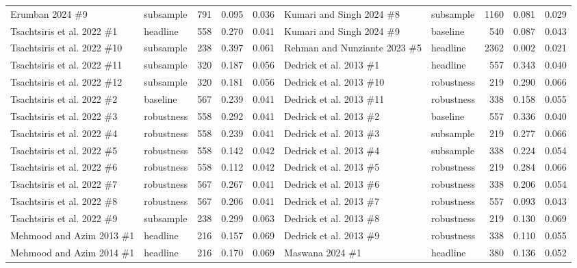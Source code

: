 {\begin{longtable}{@{}p{3.0cm} l r r r@{\hspace{0.8em}}p{3.0cm} l r r r@{}}
Erumban 2024 \#9 & subsample & 791 & 0.095 & 0.036 & Kumari and Singh 2024 \#8 & subsample & 1160 & 0.081 & 0.029 \\
Tsachtsiris et al. 2022 \#1 & headline & 558 & 0.270 & 0.041 & Kumari and Singh 2024 \#9 & baseline & 540 & 0.087 & 0.043 \\
Tsachtsiris et al. 2022 \#10 & subsample & 238 & 0.397 & 0.061 & Rehman and Nunziante 2023 \#5 & headline & 2362 & 0.002 & 0.021 \\
Tsachtsiris et al. 2022 \#11 & subsample & 320 & 0.187 & 0.056 & Dedrick et al. 2013 \#1 & headline & 557 & 0.343 & 0.040 \\
Tsachtsiris et al. 2022 \#12 & subsample & 320 & 0.181 & 0.056 & Dedrick et al. 2013 \#10 & robustness & 219 & 0.290 & 0.066 \\
Tsachtsiris et al. 2022 \#2 & baseline & 567 & 0.239 & 0.041 & Dedrick et al. 2013 \#11 & robustness & 338 & 0.158 & 0.055 \\
Tsachtsiris et al. 2022 \#3 & robustness & 558 & 0.292 & 0.041 & Dedrick et al. 2013 \#2 & baseline & 557 & 0.336 & 0.040 \\
Tsachtsiris et al. 2022 \#4 & robustness & 558 & 0.239 & 0.041 & Dedrick et al. 2013 \#3 & subsample & 219 & 0.277 & 0.066 \\
Tsachtsiris et al. 2022 \#5 & robustness & 558 & 0.142 & 0.042 & Dedrick et al. 2013 \#4 & subsample & 338 & 0.224 & 0.054 \\
Tsachtsiris et al. 2022 \#6 & robustness & 558 & 0.112 & 0.042 & Dedrick et al. 2013 \#5 & robustness & 219 & 0.284 & 0.066 \\
Tsachtsiris et al. 2022 \#7 & robustness & 567 & 0.267 & 0.041 & Dedrick et al. 2013 \#6 & robustness & 338 & 0.206 & 0.054 \\
Tsachtsiris et al. 2022 \#8 & robustness & 567 & 0.206 & 0.041 & Dedrick et al. 2013 \#7 & robustness & 557 & 0.093 & 0.043 \\
Tsachtsiris et al. 2022 \#9 & subsample & 238 & 0.299 & 0.063 & Dedrick et al. 2013 \#8 & robustness & 219 & 0.130 & 0.069 \\
Mehmood and Azim 2013 \#1 & headline & 216 & 0.157 & 0.069 & Dedrick et al. 2013 \#9 & robustness & 338 & 0.110 & 0.055 \\
Mehmood and Azim 2014 \#1 & headline & 216 & 0.170 & 0.069 & Maswana 2024 \#1 & headline & 380 & 0.136 & 0.052 \\
\end{longtable}
}